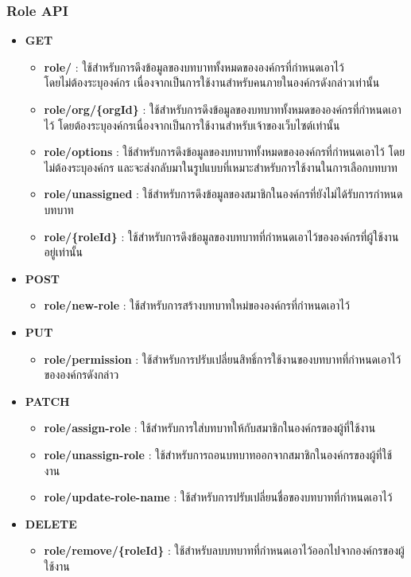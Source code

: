 \subsubsection{Role API}

\ifenglish
\else
\begin{itemize}
    \item \textbf{GET}
    \begin{itemize}
        \item \textbf{role/} : ใช้สำหรับการดึงข้อมูลของบทบาททั้งหมดขององค์กรที่กำหนดเอาไว้ \\โดยไม่ต้องระบุองค์กร เนื่องจากเป็นการใช้งานสำหรับคนภายในองค์กรดังกล่าวเท่านั้น
        \item \textbf{role/org/\{orgId\}} : ใช้สำหรับการดึงข้อมูลของบทบาททั้งหมดขององค์กรที่กำหนดเอาไว้ โดยต้องระบุองค์กรเนื่องจากเป็นการใช้งานสำหรับเจ้าของเว็บไซต์เท่านั้น
        \item \textbf{role/options} : ใช้สำหรับการดึงข้อมูลของบทบาททั้งหมดขององค์กรที่กำหนดเอาไว้ โดยไม่ต้องระบุองค์กร และจะส่งกลับมาในรูปแบบที่เหมาะสำหรับการใช้งานในการเลือกบทบาท
        \item \textbf{role/unassigned} : ใช้สำหรับการดึงข้อมูลของสมาชิกในองค์กรที่ยังไม่ได้รับการกำหนดบทบาท
        \item \textbf{role/\{roleId\}} : ใช้สำหรับการดึงข้อมูลของบทบาทที่กำหนดเอาไว้ขององค์กรที่ผู้ใช้งานอยู่เท่านั้น
    \end{itemize}
    \item \textbf{POST}
    \begin{itemize}
        \item \textbf{role/new-role} : ใช้สำหรับการสร้างบทบาทใหม่ขององค์กรที่กำหนดเอาไว้
    \end{itemize}
    \item \textbf{PUT}
    \begin{itemize}
        \item \textbf{role/permission} : ใช้สำหรับการปรับเปลี่ยนสิทธิ์การใช้งานของบทบาทที่กำหนดเอาไว้ \\ขององค์กรดังกล่าว
    \end{itemize}
    \item \textbf{PATCH}
    \begin{itemize}
        \item \textbf{role/assign-role} : ใช้สำหรับการใส่บทบาทให้กับสมาชิกในองค์กรของผู้ที่ใช้งาน
        \item \textbf{role/unassign-role} : ใช้สำหรับการถอนบทบาทออกจากสมาชิกในองค์กรของผู้ที่ใช้งาน
        \item \textbf{role/update-role-name} : ใช้สำหรับการปรับเปลี่ยนชื่อของบทบาทที่กำหนดเอาไว้
    \end{itemize}
    \item \textbf{DELETE}
    \begin{itemize}
        \item \textbf{role/remove/\{roleId\}} : ใช้สำหรับลบบทบาทที่กำหนดเอาไว้ออกไปจากองค์กรของผู้ใช้งาน
    \end{itemize}
\end{itemize}
\fi
